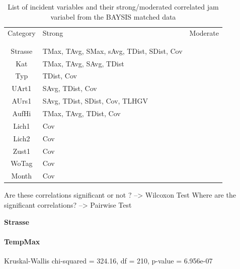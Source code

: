\documentclass[a4paper,headsepline,footsepline,fontsize=11pt,BCOR=12mm,DIV=12]{report}
\begin{document}
\noindent
\begin{table}[h!]
	\centering
	\begin{tabular}{c|l|l}  
		Category & Strong & Moderate \\
		\\[-1em]
		\hline
		\\[-1em]
		Strasse & TMax, TAvg, SMax, sAvg, TDist, SDist, Cov & \\ 
 		Kat & TMax, TAvg, SAvg, TDist & \\ 
 		Typ & TDist, Cov & \\
 		UArt1 & SAvg, TDist, Cov & \\
 		AUrs1 & SAvg, TDist, SDist, Cov, TLHGV & \\
 		AufHi & TMax, TAvg, TDist, Cov & \\
 		Lich1 & Cov & \\
 		Lich2 & Cov & \\
 		Zust1 & Cov & \\
 		WoTag & Cov & \\
 		Month & Cov & \\
	\end{tabular}
	\caption{List of incident variables and their strong/moderated correlated jam variabel from the BAYSIS matched data}
\end{table}

Are these correlations significant or not ? --> Wilcoxon Test
\smallskip
Where are the significant correlations? --> Pairwise Test

\large
\centerline{\textbf{Strasse}}
\normalsize

\paragraph{TempMax}

Kruskal-Wallis chi-squared = 324.16, df = 210, p-value = 6.956e-07
\end{document}

